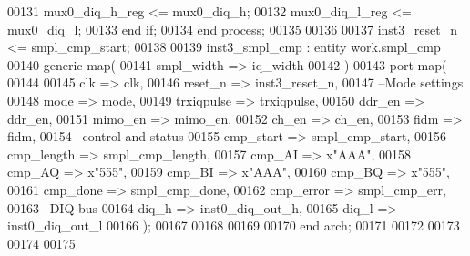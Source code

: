 \begin{DoxyCode}
00131       \textcolor{vhdlchar}{mux0_diq_h_reg} \textcolor{vhdlchar}{<=} \textcolor{vhdlchar}{mux0_diq_h};
00132       \textcolor{vhdlchar}{mux0_diq_l_reg} \textcolor{vhdlchar}{<=} \textcolor{vhdlchar}{mux0_diq_l};
00133    \textcolor{keywordflow}{end} \textcolor{keywordflow}{if};
00134 \textcolor{keywordflow}{end} \textcolor{keywordflow}{process};
00135 
00136 
00137 inst3\_reset\_n <= smpl\_cmp\_start;
00138 
00139 inst3\_smpl\_cmp : \textcolor{keywordflow}{entity} work.smpl_cmp
00140    \textcolor{keywordflow}{generic} \textcolor{keywordflow}{map}(
00141       smpl_width  => iq_width
00142    \textcolor{vhdlchar}{)}
00143    \textcolor{keywordflow}{port} \textcolor{keywordflow}{map}(
00144 
00145       clk         => clk,
00146       reset_n     => inst3_reset_n,
00147 \textcolor{keyword}{      --Mode settings}
00148       mode        => mode,
00149       trxiqpulse  => trxiqpulse,
00150       ddr_en      => ddr_en,
00151       mimo_en     => mimo_en,
00152       ch_en       => ch_en,
00153       fidm        => fidm,
00154 \textcolor{keyword}{      --control and status}
00155       cmp_start   => smpl_cmp_start,
00156       cmp_length  => smpl_cmp_length,
00157       cmp_AI      => x"AAA",
00158       cmp_AQ      => x"555",
00159       cmp_BI      => x"AAA",
00160       cmp_BQ      => x"555",
00161       cmp_done    => smpl_cmp_done,
00162       cmp_error   => smpl_cmp_err,
00163 \textcolor{keyword}{      --DIQ bus}
00164       diq_h       => inst0_diq_out_h,
00165       diq_l       => inst0_diq_out_l
00166       \textcolor{vhdlchar}{)};      
00167 
00168 
00169   
00170 \textcolor{keywordflow}{end} \textcolor{vhdlchar}{arch};   
00171 
00172 
00173 
00174 
00175 
\end{DoxyCode}
